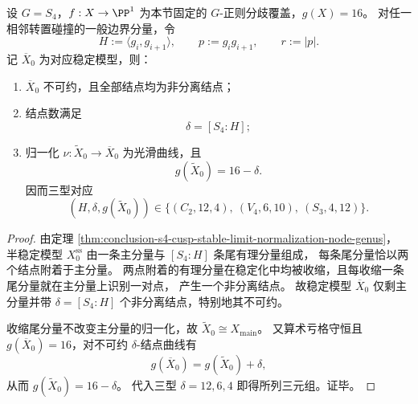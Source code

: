 \begin{theorem}[转置碰撞边界稳定化的不可约结点模型与尾群指数公式]\label{thm:conclusion-s4-cusp-stable-contraction-irreducible-nodal-index}
设 \(G=S_4\)，\(f:X\to \PP^1\) 为本节固定的 \(G\)-正则分歧覆盖，\(g(X)=16\)。
对任一相邻转置碰撞的一般边界分量，令
\[
H:=\langle g_i,g_{i+1}\rangle,\qquad p:=g_ig_{i+1},\qquad r:=|p|.
\]
记 \(\overline X_0\) 为对应稳定模型，则：
\begin{enumerate}
  \item \(\overline X_0\) 不可约，且全部结点均为非分离结点；
  \item 结点数满足
  \[
  \delta=[S_4:H];
  \]
  \item 归一化 \(\nu:\widetilde X_0\to \overline X_0\) 为光滑曲线，且
  \[
  g(\widetilde X_0)=16-\delta.
  \]
  因而三型对应
  \[
  (H,\delta,g(\widetilde X_0))
  \in\{(C_2,12,4),\ (V_4,6,10),\ (S_3,4,12)\}.
  \]
\end{enumerate}
\end{theorem}
\begin{proof}
由定理 \ref{thm:conclusion-s4-cusp-stable-limit-normalization-node-genus}，
半稳定模型 \(X_0^{\mathrm{ss}}\) 由一条主分量与 \([S_4:H]\) 条尾有理分量组成，
每条尾分量恰以两个结点附着于主分量。
两点附着的有理分量在稳定化中均被收缩，且每收缩一条尾分量就在主分量上识别一对点，
产生一个非分离结点。
故稳定模型 \(\overline X_0\) 仅剩主分量并带
\(
\delta=[S_4:H]
\)
个非分离结点，特别地其不可约。

收缩尾分量不改变主分量的归一化，故
\(
\widetilde X_0\cong X_{\mathrm{main}}
\)。
又算术亏格守恒且 \(g(\overline X_0)=16\)，对不可约 \(\delta\)-结点曲线有
\[
g(\overline X_0)=g(\widetilde X_0)+\delta,
\]
从而 \(g(\widetilde X_0)=16-\delta\)。
代入三型 \(\delta=12,6,4\) 即得所列三元组。证毕。
\end{proof}

